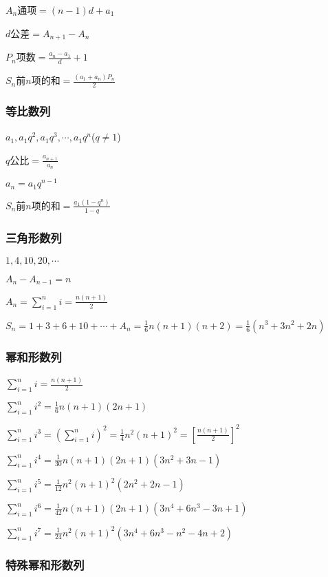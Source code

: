 \documentclass[UTF8]{ctexart}
\begin{document}
$A_{n}$通项$=(n-1)d+a_{1}$

$d$公差$=A_{n+1}-A_{n}$

$P_{n}$项数$=\frac{a_{n}-a_{1}}{d} +1$

$S_{n}$前$n$项的和$=\frac{(a_{1}+a_{n})P_{n}}{2} $

\subsubsection{等比数列}

${a_{1},a_{1}q^2,a_{1}q^3,\cdots ,a_{1}q^n}$($ q \ne 1$)

$q$公比$=\frac{a_{n+1} }{a_{n}} $

$a_{n}=a_{1}q^{n-1}$

$S_{n}$前$n$项的和$=\frac{a_{1}(1-q^n) }{1-q}$ 

\subsubsection{三角形数列}

${1,4,10,20,\cdots }$

$A_{n}-A_{n-1}=n$

$A_{n}=\displaystyle \sum_{i=1}^{n}i =\frac{n(n+1)}{2} $

$S_{n}=1+3+6+10+\cdots+A_{n}=\frac{1}{6}n(n+1)(n+2)=\frac{1}{6}(n^3+3n^2+2n) $

\subsubsection{幂和形数列}

$\displaystyle \sum_{i=1}^{n} i=\frac{n(n+1)}{2} $

$\displaystyle \sum_{i=1}^{n} i^2=\frac{1}{6} n(n+1)(2n+1)$

$\displaystyle \sum_{i=1}^{n} i^3=(\sum_{i=1}^{n} i)^2=\frac{1}{4} n^2(n+1)^2=\left [
\frac{n(n+1)}{2} \right ] ^2$

$\displaystyle \sum_{i=1}^{n} i^4=\frac{1}{30} n(n+1)(2n+1)(3n^2+3n-1)$

$\displaystyle \sum_{i=1}^{n} i^5=\frac{1}{12} n^2(n+1)^2(2n^2+2n-1)$

$\displaystyle \sum_{i=1}^{n} i^6=\frac{1}{42} n(n+1)(2n+1)(3n^4+6n^3-3n+1)$

$\displaystyle \sum_{i=1}^{n} i^7=\frac{1}{24} n^2(n+1)^2(3n^4+6n^3-n^2-4n+2)$

\subsubsection{特殊幂和形数列}
\end{document}
